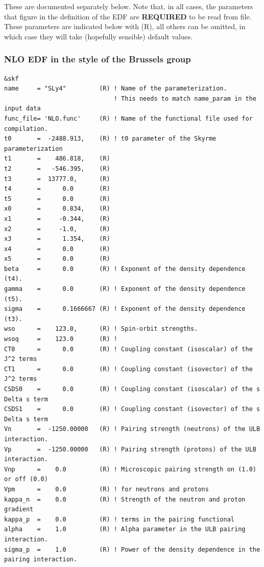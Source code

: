 \documentclass[print,amsmath,amssymb,aps,prc,nofootinbib,notitlepage]{revtex4-1}
\begin{document}
These are documented separately below. Note that, in all cases, the parameters 
that figure in the definition of the EDF are \textbf{REQUIRED} to be read from 
file. These parameters are indicated below with (R), all others can be omitted, 
in which case they will take (hopefully sensible) default values.

\clearpage
\subsubsection{NLO EDF in the style of the Brussels group}
\begin{minipage}{.8\textwidth}
\begin{Verbatim}[fontsize=\footnotesize]
&skf 
name     = "SLy4"         (R) ! Name of the parameterization. 
                              ! This needs to match name_param in the input data
func_file= 'NLO.func'     (R) ! Name of the functional file used for compilation. 
t0       =  -2488.913,    (R) ! t0 parameter of the Skyrme parameterization
t1       =    486.818,    (R)  
t2       =   -546.395,    (R)  
t3       =  13777.0,      (R)
t4       =      0.0       (R)
t5       =      0.0       (R)
x0       =      0.834,    (R)
x1       =     -0.344,    (R)
x2       =     -1.0,      (R)
x3       =      1.354,    (R) 
x4       =      0.0       (R)
x5       =      0.0       (R)
beta     =      0.0       (R) ! Exponent of the density dependence (t4).
gamma    =      0.0       (R) ! Exponent of the density dependence (t5).
sigma    =      0.1666667 (R) ! Exponent of the density dependence (t3).
wso      =    123.0,      (R) ! Spin-orbit strengths.
wsoq     =    123.0       (R) !  
CT0      =      0.0       (R) ! Coupling constant (isoscalar) of the J^2 terms
CT1      =      0.0       (R) ! Coupling constant (isovector) of the J^2 terms
CSDS0    =      0.0       (R) ! Coupling constant (isoscalar) of the s Delta s term
CSDS1    =      0.0       (R) ! Coupling constant (isovector) of the s Delta s term
Vn       =  -1250.00000   (R) ! Pairing strength (neutrons) of the ULB interaction.
Vp       =  -1250.00000   (R) ! Pairing strength (protons) of the ULB interaction.
Vnp      =    0.0         (R) ! Microscopic pairing strength on (1.0) or off (0.0)
Vpm      =    0.0         (R) ! for neutrons and protons 
kappa_n  =    0.0         (R) ! Strength of the neutron and proton gradient 
kappa_p  =    0.0         (R) ! terms in the pairing functional
alpha    =    1.0         (R) ! Alpha parameter in the ULB pairing interaction. 
sigma_p  =    1.0         (R) ! Power of the density dependence in the pairing interaction. 

\end{Verbatim}
\end{minipage}
\end{document}
